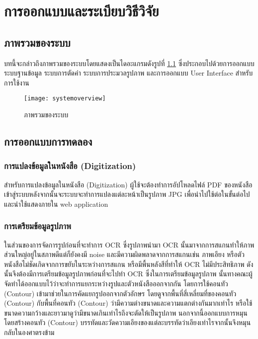 \chapter{การออกแบบและระเบียบวิธีวิจัย}

\section{ภาพรวมของระบบ}

บทนี้จะกล่าวถึงภาพรวมของระบบโดยแสดงเป็นไดอะแกรมดังรูปที่ \ref{fig:systemoverview} ซึ่งประกอบไปด้วยการออกแบบระบบฐานข้อมูล ระบบการตัดคำ ระบบการประมวลรูปภาพ และการออกแบบ User Interface สำหรับการใช้งาน

\begin{figure}[H]
    \centering
    \texttt{[image: systemoverview]}
    \caption{ภาพรวมของระบบ}\label{fig:systemoverview}
\end{figure}

\section{การออกแบบการทดลอง}
\subsection{การแปลงข้อมูลในหนังสือ (Digitization) }

สำหรับการแปลงข้อมูลในหนังสือ (Digitization) ผู้ใช้จะต้องทำการอัปโหลดไฟล์ PDF ของหนังสือเข้าสู่ระบบหลังจากนั้นจะระบบจะทำการแปลงแต่ละหน้าเป็นรูปภาพ JPG เพื่อนำไปใช้ต่อในขั้นต่อไปและนำใช้แสดงภายใน web application

\subsection{การเตรียมข้อมูลรูปภาพ}

ในส่วนของการจัดการรูปก่อนที่จะทำการ OCR ซึ่งรูปภาพนำมา OCR นั้นมาจากการสแกนทำให้ภาพส่วนใหญ่อยู่ในสภาพดีแต่ก็ยังคงมี noise  และมีความผิดพลาดจากการสแกนเช่น ภาพเอียง หรือตัวหนังสือไม่ชัดเกิดจากการขยับในระหว่างการสแกน หรือมีพื้นหลังสีที่ทำให้ OCR ไม่มีประสิทธิภาพ ดังนั้นจึงต้องมีการเตรียมข้อมูลรูปภาพก่อนที่จะไปทำ OCR
ซึ่งในการเตรียมข้อมูลรูปภาพ นั้นทางคณะผู้จัดทำได้ออกแบบไว้ว่าจะทำการแยกระหว่างรูปและตัวหนังสือออกจากกัน โดยการใช้คอนทัว (Contour) เข้ามาช่วยในการคัดแยกรูปออกจากตัวอักษร โดยดูจากพื้นที่สี่เหลี่ยมที่ของคอนทัว (Contour) กับพื้นที่คอนทัว (Contour) ว่ามีความต่างขนาดและความแตกต่างกันมากเท่าไร หรือใช้ขนาดความกว้างและยาวมาดูว่ามีขนาดเกินเท่าไรถึงจะตัดให้เป็นรูปภาพ
นอกจากนี้ออกแบบการหมุนโดยสร้างคอนทัว (Contour) บรรทัดและวัดความเอียงของแต่ละบรรทัดว่าเอียงเท่าไรจากนั้นจึงหมุนกลับในองศาตรงข้าม


